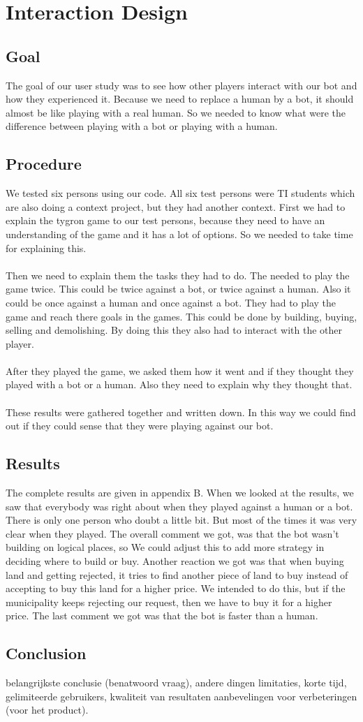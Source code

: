 \section{Interaction Design}

\subsection{Goal}
The goal of our user study was to see how other players interact with our bot and how they experienced it. Because we need to replace a human by a bot, it should almost be like playing with a real human. So we needed to know what were the difference between playing with a bot or playing with a human.

\subsection{Procedure}
We tested six persons using our code.  All six test persons were TI students which are also doing a context project, but they had another context. 
First we had to explain the tygron game to our test persons, because they need to have an understanding of the game and it has a lot of options. So we needed to take time for explaining this. 
\\ \\
Then we need to explain them the tasks they had to do. The needed to play the game twice. This could be twice against a bot, or twice against a human. Also it could be once against a human and once against a bot. They had to play the game and reach there goals in the games. This could be done by building, buying, selling and demolishing. By doing this they also had to interact with the other player. 
\\ \\
After they played the game, we asked them how it went and if they thought they played with a bot or a human. Also they need to explain why they thought that. 
\\ \\
These results were gathered together and written down. In this way we could find out if they could sense that they were playing against our bot.
\subsection{Results}
The complete results are given in appendix B.
When we looked at the results, we saw that everybody was right about when they played against a human or a bot. There is only one person who doubt a little bit. But most of the times it was very clear when they played. The overall comment we got, was that the bot wasn't building on logical places, so We could adjust this to add more strategy in deciding where to build or buy. Another reaction we got was that when buying land and getting rejected, it tries to find another piece of land to buy instead of accepting to buy this land for a higher price. We intended to do this, but if the municipality keeps rejecting our request, then we have to buy it for a higher price. The last comment we got was that the bot is faster than a human. 
\subsection{Conclusion}
belangrijkste conclusie (benatwoord vraag), andere dingen
limitaties, korte tijd, gelimiteerde gebruikers, kwaliteit van resultaten
aanbevelingen voor verbeteringen (voor het product).
\newpage